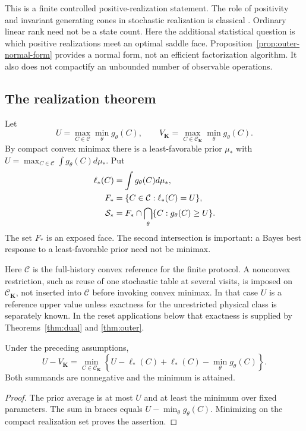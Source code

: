 This is a finite controlled positive-realization statement. The role of
positivity and invariant generating cones in stochastic realization is
classical \cite{Heller,Vidyasagar,GG}. Ordinary linear rank need not be a
state count. Here the additional statistical question is which positive
realizations meet an optimal saddle face. Proposition~\ref{prop:outer-normal-form}
provides a normal form, not an efficient factorization algorithm. It
also does not compactify an unbounded number of observable operations.

\subsection{The realization theorem}
Let
\[
 U=\max_{C\in\mathcal C}\min_{\theta}g_\theta(C),\qquad
 V_{\mathbf K}=\max_{C\in\mathcal C_{\mathbf K}}
                                      \min_\theta g_\theta(C).
\]
By compact convex minimax there is a least-favorable prior $\mu_*$ with
$U=\max_{C\in\mathcal C}\int g_\theta(C)d\mu_*$. Put
\begin{align}
 \ell_*(C)&=\int g_\theta(C)d\mu_*,\notag\\
 F_*&=\{C\in\mathcal C:\ell_*(C)=U\},\notag\\
 \mathcal S_*&=F_*\cap
             \bigcap_{\theta}\{C:g_\theta(C)\ge U\}.\label{eq:saddle-face}
\end{align}
The set $F_*$ is an exposed face. The second intersection is important:
a Bayes best response to a least-favorable prior need not be minimax.

Here $\mathcal C$ is the full-history convex reference for the finite
protocol. A nonconvex restriction, such as reuse of one stochastic table
at several visits, is imposed on $\mathcal C_{\mathbf K}$, not inserted
into $\mathcal C$ before invoking convex minimax. In that case $U$ is a
reference upper value unless exactness for the unrestricted physical
class is separately known. In the reset applications below that
exactness is supplied by Theorems~\ref{thm:dual} and \ref{thm:outer}.


\begin{proposition}
\label{prop:loss-decomposition}
Under the preceding assumptions,
\begin{equation}\label{eq:resource-loss}
 U-V_{\mathbf K}=\min_{C\in\mathcal C_{\mathbf K}}
 \left\{U-\ell_*(C)+
                  \ell_*(C)-\min_\theta g_\theta(C)\right\}.
\end{equation}
Both summands are nonnegative and the minimum is attained.
\end{proposition}
\begin{proof}
The prior average is at most $U$ and at least the minimum over fixed
parameters. The sum in braces equals $U-\min_\theta g_\theta(C)$.
Minimizing on the compact realization set proves the assertion.
\end{proof}

